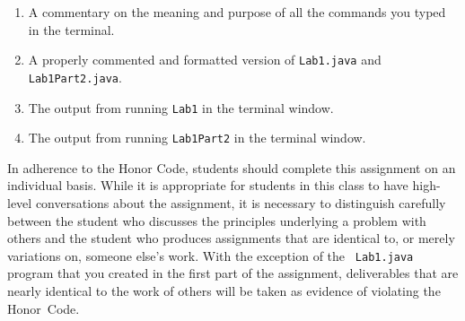\documentclass[11pt]{article}
\begin{document}
\vspace*{-.1in}
\begin{enumerate}
  \setlength{\itemsep}{0in}
\item A commentary on the meaning and purpose of all the commands you typed in the terminal.
\item A properly commented and formatted version of {\tt Lab1.java} and {\tt Lab1Part2.java}.
\item The output from running {\tt Lab1} in the terminal window.
\item The output from running {\tt Lab1Part2} in the terminal window.
\end{enumerate}
\vspace*{-.1in}

In adherence to the Honor Code, students should complete this assignment on an individual basis. While it is appropriate
for students in this class to have high-level conversations about the assignment, it is necessary to distinguish
carefully between the student who discusses the principles underlying a problem with others and the student who produces
assignments that are identical to, or merely variations on, someone else's work.  With the exception of the {\tt
Lab1.java} program that you created in the first part of the assignment, deliverables that are nearly identical to the
work of others will be taken as evidence of violating the \mbox{Honor Code}.


\end{document}
